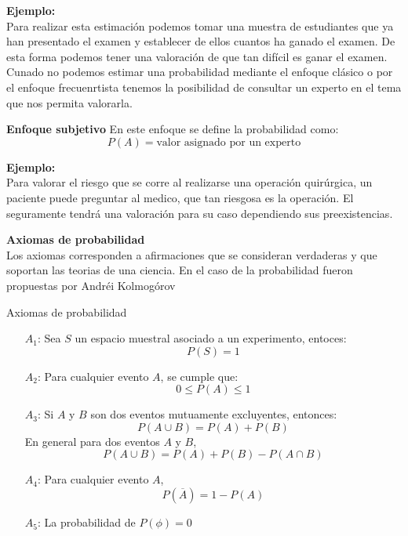 \documentclass[base=hide,12pt]{elegantbook}
\begin{document}
\textcolor{col3}{\bf Ejemplo: }\\
Para realizar esta estimación podemos tomar una muestra de estudiantes que ya han presentado el examen y establecer de  ellos cuantos ha ganado el examen. De esta forma podemos tener una valoración de que tan difícil es ganar el examen.\\

Cunado no podemos estimar  una  probabilidad mediante el  enfoque clásico o por el  enfoque frecuenrtista tenemos la posibilidad de consultar un experto en  el tema que nos permita valorarla.

\vspace{.5cm}
\begin{Box4}{\large \bf Enfoque subjetivo}
	En este enfoque se define la probabilidad como:
	$$P(A)= \text{valor asignado  por un experto}$$	
\end{Box4}

\textcolor{col3}{\bf Ejemplo: }\\
Para valorar el riesgo que se corre al realizarse una operación quirúrgica, un paciente puede preguntar al medico, que tan riesgosa es la operación. El seguramente tendrá una valoración para su caso dependiendo sus preexistencias.

\textcolor{col4}{\large  \bf Axiomas de probabilidad}\\

Los axiomas corresponden a afirmaciones que se consideran verdaderas y  que soportan las teorias de una  ciencia. En el  caso de  la probabilidad fueron propuestas por Andréi Kolmogórov

\begin{Box4}{Axiomas de probabilidad}
\begin{itemize}
		\vspace{.4cm}
	\item[$A_1$:] Sea $S$ un espacio muestral asociado a  un experimento, entoces: $$P(S)=1$$
	\vspace{.2cm}
	\item[$A_2$:] Para cualquier evento $A$, se cumple que: 
	$$0 \leq P(A) \leq 1$$ 
		\vspace{.2cm}
	\item[$A_3$:] Si $A$ y $B$ son dos eventos mutuamente excluyentes, entonces:
	$$P(A \cup B) = P(A) + P(B) $$
	En general para dos eventos $A$ y $B$, 
	$$P(A \cup B) = P(A) + P(B) -P(A\cap B)$$
		\vspace{.2cm}
	\item[$A_4$:] Para cualquier evento $A$, 
	$$P(\overline{A}) = 1 - P(A) $$
		\vspace{.2cm}
	\item[$A_5$:] La probabilidad de $P(\phi) = 0$   
\end{itemize}	
\end{Box4}	
\end{document}
